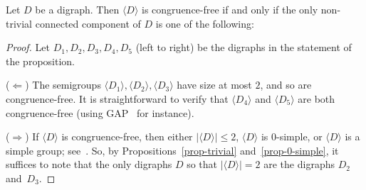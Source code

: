 \documentclass[ALCO,ThmDefs,Unicode,epreuves]{cedram}
\newcommand{\vertex}[3]{\node [vertex] (#1) at (#2, #3 * 1.7) {};}
\newcommand{\arc}[2]{{\draw[-latex] (#1) edge (#2);}}
\newcommand{\genset}[1]{\langle#1\rangle}
\begin{document}
\begin{proposition}\label{prop-congruence-free}
 Let $D$ be a digraph. Then $\genset{D}$ is
 congruence-free if and only if the only non-trivial connected component of $D$ is
 one of the following:

\smallskip
\begin{center}
 \qquad\qquad
 \qquad\qquad
 \qquad\qquad
 \qquad\qquad
\end{center}
\end{proposition}

\begin{proof}
 Let $D_1, D_2, D_3, D_4, D_5$ (left to right) be the digraphs in the statement
 of the proposition. 

 ($\Leftarrow$) The semigroups $\genset{D_1},\genset{D_2},\genset{D_3}$ have size at most $2$, and so are congruence-free. It is straightforward to verify that $\genset{D_4}$
 and $\genset{D_5}$ are both congruence-free (using GAP~\cite{GAP4} for
 instance).

 ($\Rightarrow$) If $\genset{D}$ is congruence-free, then either
 $|\genset{D}|\leq 2$, $\genset{D}$ is 0-simple, or $\genset{D}$ is a simple
 group; see~\cite[Theorems~3.7.1 and~3.7.2]{Howie1995aa}. So, by
 Propositions~\ref{prop-trivial} and~\ref{prop-0-simple}, it suffices to note
 that the only digraphs $D$ so that $|\genset{D}| = 2$ are the digraphs
 $D_2$ and~$D_3$.
\end{proof}

\goodbreak



\end{document}
